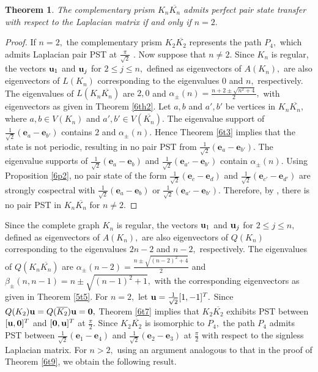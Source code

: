 \documentclass[12pt,a4paper]{article}
\newtheorem{thm}{Theorem}
\def \e {{\bf e}}
\def \u {{\bf u}}
\def \e {{\mathbf e}}
\newcommand{\ob}[1]{\left(#1\right)}
\begin{document}
\begin{thm}\label{6th10}
   The complementary prism  $K_n\overline{K_n}$ admits perfect pair state transfer with respect to the Laplacian matrix if and only if $n=2.$ 
\end{thm}
\begin{proof}
If $n=2,$ the  complementary prism $K_2\overline{K_2}$ represents the path $P_4,$ which admits Laplacian pair PST at $\frac{\pi}{\sqrt{2}}$ \cite[Theorem 7.7]{che1}. Now suppose that $n\neq 2.$ 
    Since $K_n$ is regular, the vectors $\u_1$ and $\u_j$ for $2\leq j\leq n,$ defined as eigenvectors of $A(K_n),$ are also eigenvectors of $L(K_n)$ corresponding to the eigenvalues $0$ and $n,$ respectively.
    The eigenvalues of $L\ob{K_{n}\overline{K_{n}}}$ are $2, 0$ and $\alpha_{\pm}(n)=\frac{n+2\pm\sqrt{n^2+4}}{2},$ with eigenvectors as given in Theorem \ref{6th2}. Let $a,b$ and $a',b'$ be vertices in $K_{n}\overline{K_{n}},$ where $a,b\in V(K_{n})$ and $a',b'\in V(\overline{K_{n}}).$ The eigenvalue support of $\frac{1}{\sqrt{2}}\ob{\e_a-\e_{b'}}$ contains $2$ and $\alpha_{\pm}(n).$  Hence Theorem \ref{6t3} implies that the state is not periodic, resulting in no pair PST from $\frac{1}{\sqrt{2}}\ob{\e_a-\e_{b'}}.$ 
The eigenvalue supports of $\frac{1}{\sqrt{2}}\ob{\e_a-\e_b}$ and $\frac{1}{\sqrt{2}}\ob{\e_{a'}-\e_{b'}}$ contain $\alpha_{\pm}(n).$ Using Proposition \ref{6p2}, no pair state of the form $\frac{1}{\sqrt{2}}\ob{\e_c-\e_d}$ and $\frac{1}{\sqrt{2}}\ob{\e_{c'}-\e_{d'}}$ are strongly cospectral with $\frac{1}{\sqrt{2}}\ob{\e_a-\e_b}$ or $\frac{1}{\sqrt{2}}\ob{\e_{a'}-\e_{b'}}.$ Therefore, by \cite[Lemma 5.1]{god7}, there is no pair PST in $K_n\overline{K_n}$ for $n\neq 2.$ 
\end{proof}
Since the complete graph $K_n$ is regular, the vectors $\u_1$ and $\u_j$ for $2\leq j\leq n,$ defined as eigenvectors of $A(K_n),$ are also eigenvectors of $Q(K_n)$ corresponding to the eigenvalues $2n-2$ and $n-2,$ respectively. The eigenvalues of $Q\ob{K_{n}\overline{K_{n}}}$ are $\alpha_{\pm}(n-2)=\frac{n\pm\sqrt{(n-2)^2+4}}{2}$ and $\beta_{\pm}(n,n-1)=n\pm\sqrt{(n-1)^2+1},$ with the corresponding eigenvectors as given in Theorem \ref{5t5}. 
For $n=2,$ let $\u=\frac{1}{\sqrt{2}}[1,-1]^T.$ Since $Q(K_2)\u=Q(\overline{K_2})\u=\mathbf{0},$ Theorem \ref{6t7} implies that $K_2\overline{K_2}$ exhibits PST between $[\u,\mathbf{0}]^T$ and $[\mathbf{0},\u]^T$ at $\frac{\pi}{2}.$ Since $K_2\overline{K_2}$ is isomorphic to $P_4,$ the path $P_4$ admits PST between  $\frac{1}{\sqrt{2}}\ob{\e_1-\e_4}$ and $\frac{1}{\sqrt{2}}\ob{\e_2-\e_3}$ at $\frac{\pi}{2}$ with respect to the signless Laplacian matrix. 
For $n>2,$ using an argument analogous to that in the proof of Theorem \ref{6t9}, we obtain the following result.
\end{document}
